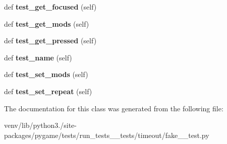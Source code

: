 \begin{DoxyCompactItemize}
\item 
\mbox{\label{classpygame_1_1tests_1_1run__tests____tests_1_1timeout_1_1fake__2__test_1_1_key_module_test_a2099f4341572e6041fd52ffa24eba1f2}} 
def {\bfseries test\+\_\+get\+\_\+focused} (self)
\item 
\mbox{\label{classpygame_1_1tests_1_1run__tests____tests_1_1timeout_1_1fake__2__test_1_1_key_module_test_af2c61375e42fd962271cd5f236809207}} 
def {\bfseries test\+\_\+get\+\_\+mods} (self)
\item 
\mbox{\label{classpygame_1_1tests_1_1run__tests____tests_1_1timeout_1_1fake__2__test_1_1_key_module_test_a5409a421ec121b887cbfb57fe36036d0}} 
def {\bfseries test\+\_\+get\+\_\+pressed} (self)
\item 
\mbox{\label{classpygame_1_1tests_1_1run__tests____tests_1_1timeout_1_1fake__2__test_1_1_key_module_test_aaeac70a1f9f2a2deec267c0383e4daac}} 
def {\bfseries test\+\_\+name} (self)
\item 
\mbox{\label{classpygame_1_1tests_1_1run__tests____tests_1_1timeout_1_1fake__2__test_1_1_key_module_test_a1b3f915156e6a92d53d929c4c7aaea18}} 
def {\bfseries test\+\_\+set\+\_\+mods} (self)
\item 
\mbox{\label{classpygame_1_1tests_1_1run__tests____tests_1_1timeout_1_1fake__2__test_1_1_key_module_test_a26ad2ee55cd3715d80a89385e19757fe}} 
def {\bfseries test\+\_\+set\+\_\+repeat} (self)
\end{DoxyCompactItemize}


The documentation for this class was generated from the following file\+:\begin{DoxyCompactItemize}
\item 
venv/lib/python3./site-\/packages/pygame/tests/run\+\_\+tests\+\_\+\+\_\+tests/timeout/fake\+\_\+\_\+test.\+py\end{DoxyCompactItemize}
